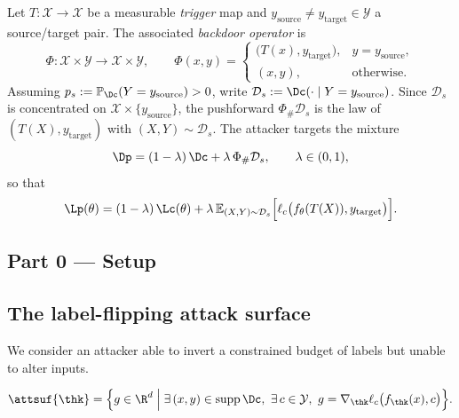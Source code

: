 \begin{example}
\label{ex:backdoor}
Let $T:\mathcal X\to\mathcal X$ be a measurable \emph{trigger} map and $y_{\mathrm{source}}\neq y_{\mathrm{target}}\in\mathcal Y$ a source/target pair. The associated \emph{backdoor operator} is
\[
\Phi:\mathcal X\times\mathcal Y\to\mathcal X\times\mathcal Y,
\qquad
\Phi(x,y)=
\begin{cases}
\big(T(x),y_{\mathrm{target}}\big), & y=y_{\mathrm{source}},\\
(x,y), & \text{otherwise.}
\end{cases}
\]
Assuming $p_s:=\mathbb{P}_{\Dc}(Y=y_{\mathrm{source}})>0$, write $\mathcal D_s:=\Dc(\cdot\mid Y=y_{\mathrm{source}})$. Since $\mathcal D_s$ is concentrated on $\mathcal X\times\{y_{\mathrm{source}}\}$, the pushforward $\Phi_\#\mathcal D_s$ is the law of $(T(X),y_{\mathrm{target}})$ with $(X,Y)\sim\mathcal D_s$. The attacker targets the mixture
\begin{equation}\label{eq:bd-Dp}
\Dp=(1-\lambda)\,\Dc+\lambda\,\Phi_\#\mathcal D_s,\qquad\lambda\in(0,1),
\end{equation}
so that
\begin{equation}\label{eq:bd-Lp-split}
\Lp(\theta)=(1-\lambda)\,\Lc(\theta)+\lambda\,\mathbb{E}_{(X,Y)\sim\mathcal D_s}\Big[\ell_c\big(f_\theta(T(X)),y_{\mathrm{target}}\big)\Big].
\end{equation}
\end{example}


\subsection*{Part 0 --- Setup}

\subsection{The label-flipping attack surface}
\label{sec:flip-surface}

We consider an attacker able to invert a constrained budget of labels but unable to alter inputs.

\begin{definition}
\label{def:flip-surface}
\begin{equation}
\attsuf{\thk}
=\Big\{g\in\R^d\;\Big|\;\exists\,(x,y)\in\operatorname{supp}\Dc,\ \exists\,c\in\mathcal{Y},\
g=\nabla_{\thk}\ell_c\big(f_{\thk}(x),c\big)\Big\}.
\end{equation}
\end{definition}

